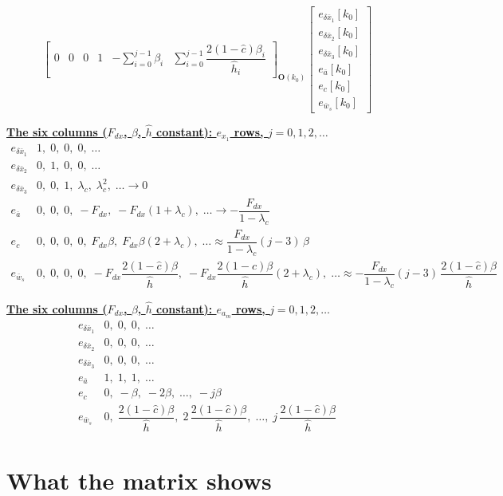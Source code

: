 \documentclass[11pt,a4paper]{ctexart}
\newcommand{\lc}{\lambda_c}
\newcommand{\bx}{\bar{x}}
\newcommand{\ba}{\bar{a}}
\newcommand{\bw}{\bar{w}}
\newcommand{\hh}{\hat{h}}
\newcommand{\ch}{\hat{c}}
\newcommand{\hd}[1]{\par\bigskip\noindent\underline{\textbf{#1}}}
\begin{document}
{\[{\begin{bmatrix}
0 & 0 & 0 & 1 & -\textstyle\sum_{i=0}^{j-1}\beta_i & \textstyle\sum_{i=0}^{j-1}\dfrac{2(1-\ch)\beta_i}{\hh_i}
\end{bmatrix}}_{\mathbf{O}(k_0)}
\begin{bmatrix} e_{\delta\bx_1}[k_0] \\ e_{\delta\bx_2}[k_0] \\ e_{\delta\bx_3}[k_0] \\ e_{\ba}[k_0] \\ e_c[k_0] \\ e_{\bw_s}[k_0] \end{bmatrix}
\]
}

\hd{The six columns ($F_{dx}$, $\beta$, $\hh$ constant): $e_{x_1}$ rows, $j = 0, 1, 2, \dots$}
{\small
\[
\begin{array}{c|l}
e_{\delta\bx_1} & 1,\; 0,\; 0,\; 0,\; \dots \\
e_{\delta\bx_2} & 0,\; 1,\; 0,\; 0,\; \dots \\
e_{\delta\bx_3} & 0,\; 0,\; 1,\; \lc,\; \lc^2,\; \dots \to 0 \\
e_{\ba} & 0,\; 0,\; 0,\; -F_{dx},\; -F_{dx}(1+\lc),\; \dots \to -\dfrac{F_{dx}}{1-\lc} \\[1.2ex]
e_c & 0,\; 0,\; 0,\; 0,\; F_{dx}\beta,\; F_{dx}\beta(2+\lc),\; \dots \approx \dfrac{F_{dx}}{1-\lc}(j-3)\,\beta \\[1.6ex]
e_{\bw_s} & 0,\; 0,\; 0,\; 0,\; -F_{dx}\dfrac{2(1-\ch)\beta}{\hh},\; -F_{dx}\dfrac{2(1-\ch)\beta}{\hh}(2+\lc),\; \dots \approx -\dfrac{F_{dx}}{1-\lc}(j-3)\,\dfrac{2(1-\ch)\beta}{\hh}
\end{array}
\]
}

\hd{The six columns ($F_{dx}$, $\beta$, $\hh$ constant): $e_{a_m}$ rows, $j = 0, 1, 2, \dots$}
{\small
\[
\begin{array}{c|l}
e_{\delta\bx_1} & 0,\; 0,\; 0,\; \dots \\
e_{\delta\bx_2} & 0,\; 0,\; 0,\; \dots \\
e_{\delta\bx_3} & 0,\; 0,\; 0,\; \dots \\
e_{\ba} & 1,\; 1,\; 1,\; \dots \\
e_c & 0,\; -\beta,\; -2\beta,\; \dots,\; -j\beta \\[1.2ex]
e_{\bw_s} & 0,\; \dfrac{2(1-\ch)\beta}{\hh},\; 2\,\dfrac{2(1-\ch)\beta}{\hh},\; \dots,\; j\,\dfrac{2(1-\ch)\beta}{\hh}
\end{array}
\]
}

\clearpage
\section{What the matrix shows}
\end{document}
